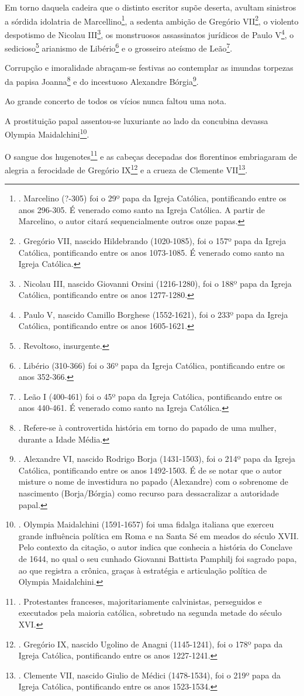 Em torno daquela cadeira que o distinto escritor supõe deserta, avultam
sinistros a sórdida idolatria de Marcellino\footnote{. Marcelino (?-305)
  foi o 29º papa da Igreja Católica, pontificando entre os anos 296-305.
  É venerado como santo na Igreja Católica. A partir de Marcelino, o
  autor citará sequencialmente outros onze papas.}, a sedenta ambição de
Gregório VII\footnote{. Gregório VII, nascido Hildebrando (1020-1085),
  foi o 157º papa da Igreja Católica, pontificando entre os anos
  1073-1085. É venerado como santo na Igreja Católica.}, o violento
despotismo de Nicolau III\footnote{. Nicolau III, nascido Giovanni
  Orsini (1216-1280), foi o 188º papa da Igreja Católica, pontificando
  entre os anos 1277-1280.}, os monstruosos assassinatos jurídicos de
Paulo V\footnote{. Paulo V, nascido Camillo Borghese (1552-1621), foi o
  233º papa da Igreja Católica, pontificando entre os anos 1605-1621.},
o sedicioso\footnote{. Revoltoso, insurgente.} arianismo de
Libério\footnote{. Libério (310-366) foi o 36º papa da Igreja Católica,
  pontificando entre os anos 352-366.} e o grosseiro ateísmo de
Leão\footnote{. Leão I (400-461) foi o 45º papa da Igreja Católica,
  pontificando entre os anos 440-461. É venerado como santo na Igreja
  Católica.}.

Corrupção e imoralidade abraçam-se festivas ao contemplar as imundas
torpezas da papisa Joanna\footnote{. Refere-se à controvertida história
  em torno do papado de uma mulher, durante a Idade Média.} e do
incestuoso Alexandre Bórgia\footnote{. Alexandre VI, nascido Rodrigo
  Borja (1431-1503), foi o 214º papa da Igreja Católica, pontificando
  entre os anos 1492-1503. É de se notar que o autor misture o nome de
  investidura no papado (Alexandre) com o sobrenome de nascimento
  (Borja/Bórgia) como recurso para dessacralizar a autoridade papal.}.

Ao grande concerto de todos os vícios nunca faltou uma nota.

A prostituição papal assentou-se luxuriante ao lado da concubina devassa
Olympia Maidalchini\footnote{. Olympia Maidalchini (1591-1657) foi uma
  fidalga italiana que exerceu grande influência política em Roma e na
  Santa Sé em meados do século XVII. Pelo contexto da citação, o autor
  indica que conhecia a história do Conclave de 1644, no qual o seu
  cunhado Giovanni Battista Pamphilj foi sagrado papa, ao que registra a
  crônica, graças à estratégia e articulação política de Olympia
  Maidalchini.}.

O sangue dos hugenotes\footnote{. Protestantes franceses,
  majoritariamente calvinistas, perseguidos e executados pela maioria
  católica, sobretudo na segunda metade do século XVI.} e as cabeças
decepadas dos florentinos embriagaram de alegria a ferocidade de
Gregório IX\footnote{. Gregório IX, nascido Ugolino de Anagni
  (1145-1241), foi o 178º papa da Igreja Católica, pontificando entre os
  anos 1227-1241.} e a crueza de Clemente VII\footnote{. Clemente VII,
  nascido Giulio de Médici (1478-1534), foi o 219º papa da Igreja
  Católica, pontificando entre os anos 1523-1534.}.

